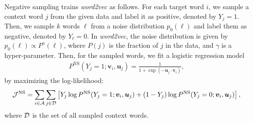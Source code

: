 \documentclass[12pt,a4paper]{article}
\newcommand{\vect}[1]{\boldsymbol{#1}}
\begin{document}
Negative sampling trains {\it word2vec} as follows.
For each target word $i$, we sample a context word $j$ from the given data and label it as positive, denoted by $Y_{j}=1$.
Then, we sample $k$ words $\ell$ from a noise distribution $p_0(\ell)$ and label them as negative, denoted by $Y_{\ell}=0$.
In \textit{word2vec}, the noise distribution is given by $p_0(\ell) \propto P^\gamma (\ell)$, where $P(j)$ is the fraction of $j$ in the data, and $\gamma$ is a hyper-parameter.
Then, for the sampled words, we fit a logistic regression model
\begin{align}
	\label{eq:logistic-regress}
	P^{\text{NS}}(Y_{j} = 1; \vect{v}_{i}, \vect{u}_j) = \frac{1}{1 + \exp(-\vect{u}_j \cdot \vect{v}_{i})},
\end{align}
by maximizing the log-likelihood:
\begin{align}
	\label{eq:log-likelihood-logistic-regress}
	{\cal J}^{\text{NS}} = \sum_{i \in {\cal A}} \sum_{j \in {\cal D}} \left[ Y_{j} \log P^{\text{NS}}(Y_{j} = 1; \vect{v}_{i}, \vect{u}_j) + (1-Y_{j}) \log P^{\text{NS}}(Y_{j} = 0; \vect{v}_{i}, \vect{u}_j)\right],
\end{align}
where ${\cal D}$ is the set of all sampled context words.
\end{document}
